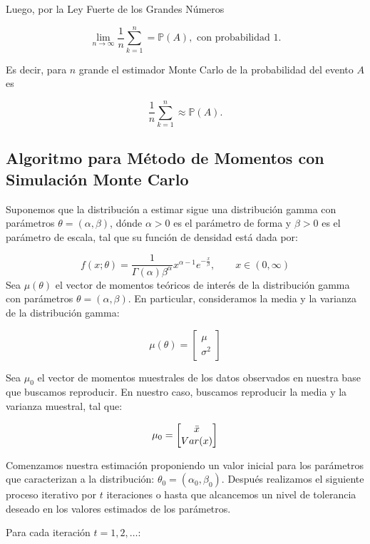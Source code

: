 \documentclass[9pt,twocolumn,twoside,]{pnas-new}
\begin{document}
Luego, por la Ley Fuerte de los Grandes Números

\[\lim_{n\to\infty} \frac{1}{n}\sum_{k=1}^n = \mathbb{P}(A), \text{ con probabilidad 1.}\]

Es decir, para \(n\) grande el estimador Monte Carlo de la probabilidad
del evento \(A\) es

\[\frac{1}{n}\sum_{k=1}^n \approx \mathbb{P}(A) .\]

\hypertarget{algoritmo-para-muxe9todo-de-momentos-con-simulaciuxf3n-monte-carlo}{%
\subsection{Algoritmo para Método de Momentos con Simulación Monte
Carlo}\label{algoritmo-para-muxe9todo-de-momentos-con-simulaciuxf3n-monte-carlo}}

Suponemos que la distribución a estimar sigue una distribución gamma con
parámetros \(\theta = (\alpha, \beta)\), dónde \(\alpha > 0\) es el
parámetro de forma y \(\beta > 0\) es el parámetro de escala, tal que su
función de densidad está dada por:

\[f(x;\theta) = \frac{1}{\Gamma(\alpha)\beta^{\alpha}}x^{\alpha-1}e^{-\frac{x}{\beta}}, \qquad x\in(0,\infty)\]
Sea \(\mu(\theta)\) el vector de momentos teóricos de interés de la
distribución gamma con parámetros \(\theta = (\alpha, \beta)\). En
particular, consideramos la media y la varianza de la distribución
gamma:

\[\mu(\theta) = \begin{bmatrix} \mu \\ \sigma^{2} \end{bmatrix}\]

Sea \(\mu_{0}\) el vector de momentos muestrales de los datos observados
en nuestra base que buscamos reproducir. En nuestro caso, buscamos
reproducir la media y la varianza muestral, tal que:

\[\mu_{0} = \begin{bmatrix} \Bar{x} \\ Var(x) \end{bmatrix}\]

Comenzamos nuestra estimación proponiendo un valor inicial para los
parámetros que caracterizan a la distribución:
\(\theta_{0} = (\alpha_{0}, \beta_{0})\). Después realizamos el
siguiente proceso iterativo por \(t\) iteraciones o hasta que alcancemos
un nivel de tolerancia deseado en los valores estimados de los
parámetros.

Para cada iteración \(t = 1, 2, \dots\):
\end{document}
